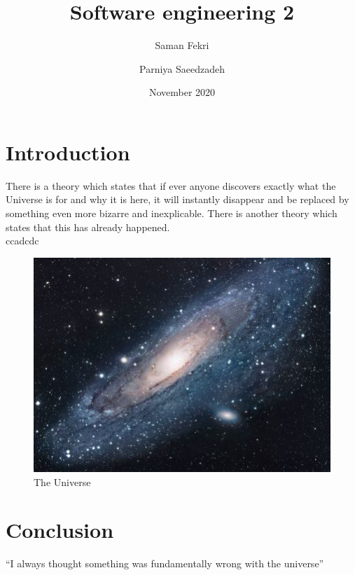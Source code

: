 \documentclass{article}
\title{Software engineering 2}
\author[1]{Saman Fekri}
\author[2]{Parniya Saeedzadeh}
\date{November 2020}
\begin{document}

\section{Introduction}
There is a theory which states that if ever anyone discovers exactly what the Universe is for and why it is here, it will instantly disappear and be replaced by something even more bizarre and inexplicable.
There is another theory which states that this has already happened.\\
ccadcdc 
\begin{figure}[h!]
\centering
\includegraphics[scale=1.7]{universe}
\caption{The Universe}
\label{fig:universe}
\end{figure}

\section{Conclusion}
``I always thought something was fundamentally wrong with the universe'' \citep{adams1995hitchhiker}





\end{document}
